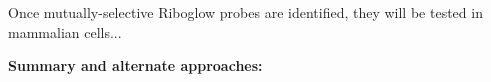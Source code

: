 Once mutually-selective Riboglow probes are identified, they will be tested in mammalian cells...

\textbf{Summary and alternate approaches:}

